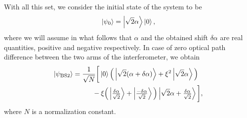 With all this set, we consider the initial state of the system to be
\begin{equation}
    \ket{\psi_0}
        = \ket{\sqrt{2} \alpha}\ket{0},
\end{equation}
where we will assume in what follows that $\alpha$ and the obtained shift $\delta \alpha$ are real quantities, positive and negative respectively. In case of zero optical path difference between the two arms of the interferometer, we obtain
\begin{equation}\label{State:BS2}
    \begin{aligned}
    \ket{\psi_\text{BS2}}
        &=
        \dfrac{1}{\sqrt{N}}
                \bigg[
                      \ket{0}\Big(
                            \ket{\sqrt{2}(\alpha + \delta \alpha)}
                            + \xi^2 
                              \ket{\sqrt{2}\alpha}
                             \Big)
                      \\
                      &\hspace{1cm}
                      - \xi
                       \Big(
                            \ket{\tfrac{\delta \alpha}{\sqrt{2}}}
                            + \ket{\tfrac{-\delta \alpha}{\sqrt{2}}}
                        \Big)
                       \ket{\sqrt{2}\alpha  +\tfrac{\delta \alpha}{\sqrt{2}}}
                \bigg],
    \end{aligned}
\end{equation}
where $N$ is a normalization constant.

